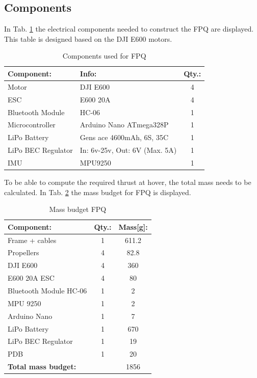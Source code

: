 \subsection{Components}
In Tab. \ref{tab:CompFPQ} the electrical components needed to construct the FPQ are displayed. This table is designed based on the DJI E600 motors. 
\begin{table}[H]
    \begin{center}
    \caption{Components used for FPQ} 
    \label{tab:CompFPQ} 
        \begin{tabular}{|l|l|c|}
            \hline 
            \textbf{Component:} & \textbf{Info:} & \textbf{Qty.:}  \\ 
            \hline
            Motor & DJI E600  & 4 \\
            ESC & E600 20A & 4 \\
            Bluetooth Module & HC-06 & 1  \\
            Microcontroller & Arduino Nano  ATmega328P& 1 \\
            LiPo Battery & Gens ace 4600mAh, 6S, 35C & 1 \\
            LiPo BEC Regulator & In: 6v-25v, Out: 6V (Max. 5A)  & 1\\
            IMU & MPU9250 & 1 \\
            \hline
        \end{tabular}
    \end{center}
\end{table}
\noindent
To be able to compute the required thrust at hover, the total mass needs to be calculated. In Tab. \ref{tab:WeightFPQ} the mass budget for FPQ is displayed.
\begin{table}[H]
    \begin{center}
    \caption{Mass budget FPQ} 
    \label{tab:WeightFPQ} 
        \begin{tabular}{|l|c|c|}
            \hline 
            \textbf{Component:} & \textbf{Qty.:} & \textbf{Mass[g]:}  \\ 
            \hline
            Frame + cables & 1 & 611.2\\
            Propellers & 4 & 82.8\\
            DJI E600  & 4 & 360 \\
            E600 20A ESC & 4 & 80 \\
            Bluetooth Module HC-06 & 1 & 2\\
            MPU 9250 & 1 & 2 \\
            Arduino Nano & 1 & 7 \\
            LiPo Battery & 1 & 670 \\
            LiPo BEC Regulator & 1 & 19 \\
            PDB & 1 & 20 \\\hline
            \textbf{Total mass budget:} & & 1856\\
            \hline
        \end{tabular}
    \end{center}
\end{table}
